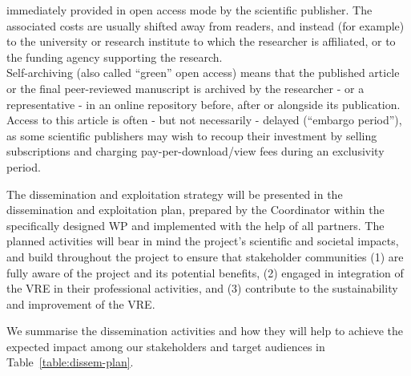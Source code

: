 {immediately provided in open access mode by the scientific publisher. The associated costs
are usually shifted away from readers, and instead (for example) to the university or
research institute to which the researcher is affiliated, or to the funding agency supporting
the research.\\
Self-archiving (also called ``green'' open access) means that the published article or the
final peer-reviewed manuscript is archived by the researcher - or a representative - in an
online repository before, after or alongside its publication. Access to this article is often -
but not necessarily - delayed (``embargo period''), as some scientific publishers may wish to
recoup their investment by selling subscriptions and charging pay-per-download/view fees
during an exclusivity period.}


The dissemination and exploitation strategy will be
presented in the dissemination and exploitation plan, prepared by the
Coordinator within  the specifically designed WP
and implemented with the help of all partners. The planned activities
will bear in mind the project's scientific and societal impacts, and
build throughout the project to ensure that stakeholder communities
(1) are fully aware of the project and its potential benefits, (2)
engaged in integration of the VRE in their professional activities,
and (3) contribute to the sustainability and improvement of the
VRE. 

We summarise the dissemination activities
and how they will help to achieve the expected impact among our
stakeholders and target audiences in Table~\ref{table:dissem-plan}.


